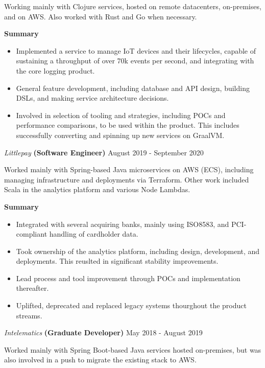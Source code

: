 \documentclass[margin, 11pt]{style}
\begin{document}
\begin{resume}
Working mainly with Clojure services, hosted on remote datacenters, on-premises, and on AWS. Also worked with Rust and Go when necessary.

\textbf{Summary}

\begin{itemize}
\item Implemented a service to manage IoT devices and their lifecycles, capable of sustaining a throughput of over 70k events per second, and integrating with the core logging product.
\item General feature development, including database and API design, building DSLs, and making service architecture decisions.
\item Involved in selection of tooling and strategies, including POCs and performance comparisons, to be used within the product. This includes successfully converting and spinning up new services on GraalVM.
\end{itemize}

\pagebreak

{\sl Littlepay} \textbf{(Software Engineer)} \hfill August 2019 - September 2020

Worked mainly with Spring-based Java microservices on AWS (ECS), including managing infrastructure and deployments via Terraform. Other work included Scala in the analytics platform and various Node Lambdas.

\textbf{Summary}

\begin{itemize}
\item Integrated with several acquiring banks, mainly using ISO8583, and PCI-compliant handling of cardholder data.
\item Took ownership of the analytics platform, including design, development, and deployments. This reuslted in significant stability improvements.
\item Lead process and tool improvement through POCs and implementation thereafter.
\item Uplifted, deprecated and replaced legacy systems thourghout the product streams.
\end{itemize}

\vspace{15pt}
{\sl Intelematics} \textbf{(Graduate Developer)} \hfill May 2018 - August 2019

Worked mainly with Spring Boot-based Java services hosted on-premises, but was also involved in a push to migrate the existing stack to AWS.


\end{resume}
\end{document}
